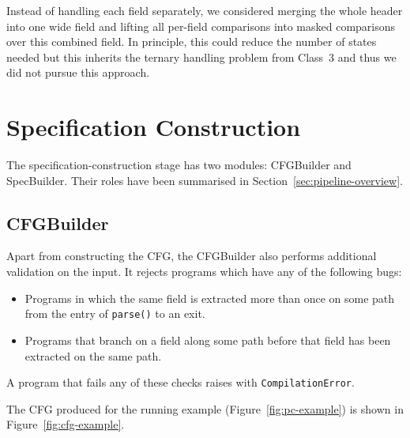 Instead of handling each field separately, we considered merging the
whole header into one wide field and lifting all per-field comparisons
into masked comparisons over this combined field. In principle, this could
reduce the number of states needed but this inherits the ternary handling problem 
from Class~3 and thus we did not pursue this approach.

\section{Specification Construction}
\label{sec:spec-construction}

The specification-construction stage has two modules: CFGBuilder and
SpecBuilder. Their roles have been summarised in
Section~\ref{sec:pipeline-overview}.

\subsection{CFGBuilder}

Apart from constructing the CFG, the CFGBuilder also performs
additional validation on the input. It rejects programs which have any
of the following bugs:
\begin{itemize}
    \item Programs in which the same field is extracted more than once on
    some path from the entry of \texttt{parse()} to an exit.
    \item Programs that branch on a field along some path before that
    field has been extracted on the same path.
\end{itemize}
A program that fails any of these checks raises with
\texttt{CompilationError}.

The CFG produced for the running example (Figure~\ref{fig:pc-example})
is shown in Figure~\ref{fig:cfg-example}.

